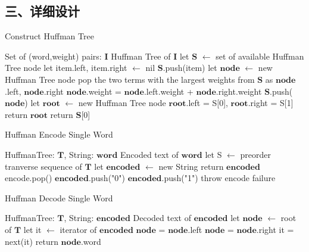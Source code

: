 \documentclass[UTF8, a4paper]{ctexart}
\begin{document}
\subsection*{三、详细设计}
\begin{algorithm}[H]
\begin{algorithmic}[1]
\caption{Construct Huffman Tree}
\Require Set of (word,weight) pairs: $\mathbf{I}$
\Ensure Huffman Tree of $\mathbf{I}$
\State let $\mathbf{S}$ $\leftarrow$ set of available Huffman Tree node
	\State let item.left, item.right $\leftarrow$ nil
	\State $\mathbf{S}$.push(item)
\EndFor
{}
	\State let $\mathbf{node}$ $\leftarrow$ new Huffman Tree node
	\State pop the two terms with the largest weights from $\mathbf{S}$ as $\mathbf{node}$.left, $\mathbf{node}$.right
	\State $\mathbf{node}$.weight = $\mathbf{node}$.left.weight + $\mathbf{node}$.right.weight
	\State $\mathbf{S}$.push($\mathbf{node}$)
\EndWhile
{}
	\State let $\mathbf{root}$ $\leftarrow$ new Huffman Tree node
	\State $\mathbf{root}$.left = S[0], $\mathbf{root}$.right = S[1]
	\State return $\mathbf{root}$
\Else
	\State return $\mathbf{S}$[0]
\EndIf
\end{algorithmic}
\end{algorithm}

\begin{algorithm}[H]
\begin{algorithmic}[1]
\caption{Huffman Encode Single Word}
\Require HuffmanTree: $\mathbf{T}$, String: $\mathbf{word}$
\Ensure Encoded text of $\mathbf{word}$
\State let S $\leftarrow$ preorder tranverse sequence of $\mathbf{T}$
\State let $\mathbf{encoded}$ $\leftarrow$ new String
		\State return $\mathbf{encoded}$
	\EndIf
		\State encode.pop()
	\EndIf
		\State $\mathbf{encoded}$.push("0")
	\Else
		\State $\mathbf{encoded}$.push("1")
	\EndIf
\EndFor
\State throw encode failure
\end{algorithmic}
\end{algorithm}

\begin{algorithm}[H]
\begin{algorithmic}[1]
\caption{Huffman Decode Single Word}
\Require HuffmanTree: $\mathbf{T}$, String: $\mathbf{encoded}$
\Ensure Decoded text of $\mathbf{encoded}$
\State let $\mathbf{node}$ $\leftarrow$ root of $\mathbf{T}$
\State let it $\leftarrow$ iterator of $\mathbf{encoded}$
		\State $\mathbf{node}$ = $\mathbf{node}$.left
	\Else
		\State $\mathbf{node}$ = $\mathbf{node}$.right
	\EndIf
	\State it = next(it)
\EndWhile
\State return $\mathbf{node}$.word
\end{algorithmic}
\end{algorithm}
\end{document}
